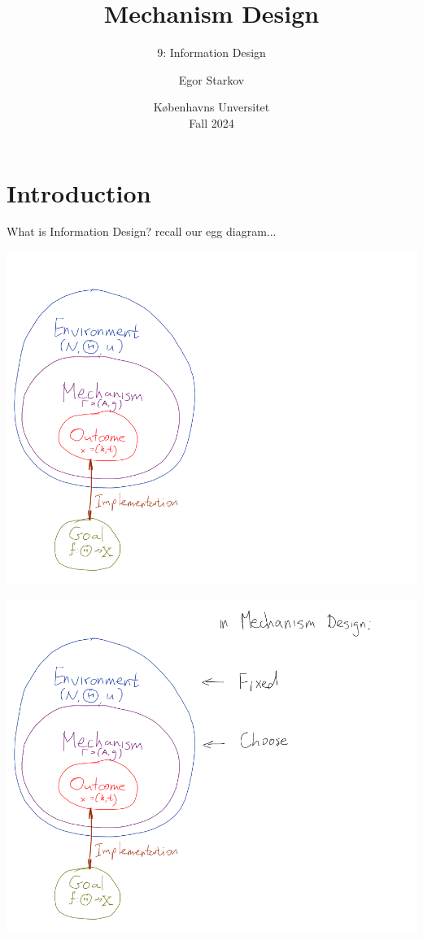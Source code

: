 \documentclass[english,10pt
,aspectratio=169
]{beamer}
\title{Mechanism Design}
\subtitle{9: Information Design}
\author{Egor Starkov}
\date{K{\o}benhavns Unversitet \\
	Fall 2024}
\begin{document}
	\frame[plain]{\titlepage}


\section{Introduction}


\begin{frame}{What is Information Design?}
	recall our egg diagram...
\end{frame}


\begin{frame}
	\centering
	\includegraphics[scale=0.32]{pics/M7/MD_vs_ID_1}
\end{frame}


\begin{frame}
	\centering
	\includegraphics[scale=0.32]{pics/M7/MD_vs_ID_2}
\end{frame}
\end{document}
